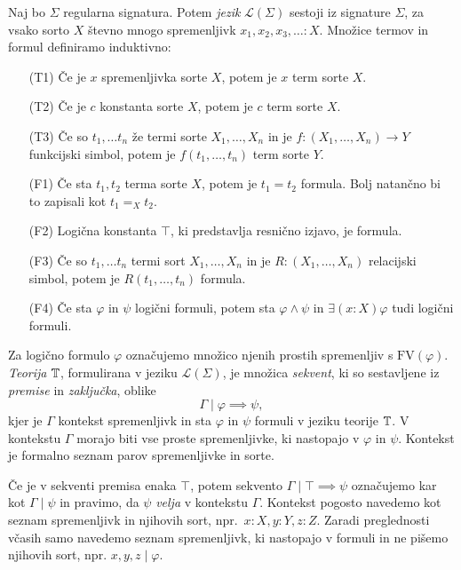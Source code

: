 \documentclass[../kategoricna_logika.tex]{subfiles}
\begin{document}
\begin{definicija}
  Naj bo $\Sigma$ regularna signatura.  Potem \emph{jezik}
  $\mathcal{L}(\Sigma)$ sestoji iz signature $\Sigma$, za vsako
  sorto $X$ števno mnogo spremenljivk $x_1,x_2,x_3,\ldots : X$.
  Množice termov in formul definiramo induktivno:
  \begin{itemize}
  \item [(T1)] Če je $x$ spremenljivka sorte $X$, potem je $x$ term
    sorte $X$.
  \item [(T2)] Če je $c$ konstanta sorte $X$, potem je $c$ term sorte
    $X$.
  \item [(T3)] Če so $t_1, \ldots t_n$ že termi sorte
    $X_1, \ldots, X_n$ in je $f : (X_1, \ldots, X_n) \to Y$
    funkcijski simbol, potem je $f(t_1, \ldots, t_n)$ term sorte $Y$.
  \item [(F1)] Če sta $t_1, t_2$ terma sorte $X$, potem je $t_1 = t_2$
    formula. Bolj natančno bi to zapisali kot $t_1 =_X t_2$.
  \item [(F2)] Logična konstanta $\top$, ki predstavlja resnično
    izjavo, je formula.
  \item [(F3)] Če so $t_1, \ldots t_n$ termi sort $X_1, \ldots, X_n$
    in je $R : (X_1, \ldots, X_n)$ relacijski
    simbol, potem je $R(t_1, \ldots, t_n)$ formula.
  \item [(F4)] Če sta $\varphi$ in $\psi$ logični formuli, potem sta
    $\varphi \wedge \psi$ in $\exists (x:X) \varphi$ tudi logični formuli.
  \end{itemize}
  Za logično formulo $\varphi$ označujemo množico njenih prostih
  spremenljiv s $\mathrm{FV}(\varphi)$.  \emph{Teorija} $\mathbb{T}$,
  formulirana v jeziku $\mathcal{L}(\Sigma)$, je množica
  \emph{sekvent}, ki so sestavljene iz \emph{premise} in
  \emph{zaključka}, oblike
  \[ \Gamma \mid \varphi \implies \psi,\]
  kjer je $\Gamma$ kontekst spremenljivk in sta
  $\varphi$ in $\psi$ formuli v jeziku teorije $\mathbb{T}$.
  V kontekstu $\Gamma$ morajo biti vse proste spremenljivke,
  ki nastopajo v $\varphi$ in $\psi$. Kontekst je formalno seznam parov
  spremenljivke in sorte.
\end{definicija}
Če je v sekventi premisa enaka $\top$, potem sekvento
$\Gamma \mid \top \implies \psi$ označujemo kar kot $\Gamma \mid \psi$ in pravimo, da $\psi$
\emph{velja} v kontekstu $\Gamma$.
Kontekst pogosto navedemo kot seznam spremenljivk in njihovih sort, npr.\ $x : X, y:Y, z:Z$.
Zaradi preglednosti včasih samo navedemo seznam spremenljivk, ki nastopajo v formuli
in ne pišemo njihovih sort, npr. $x,y,z \mid \varphi$.
\end{document}
